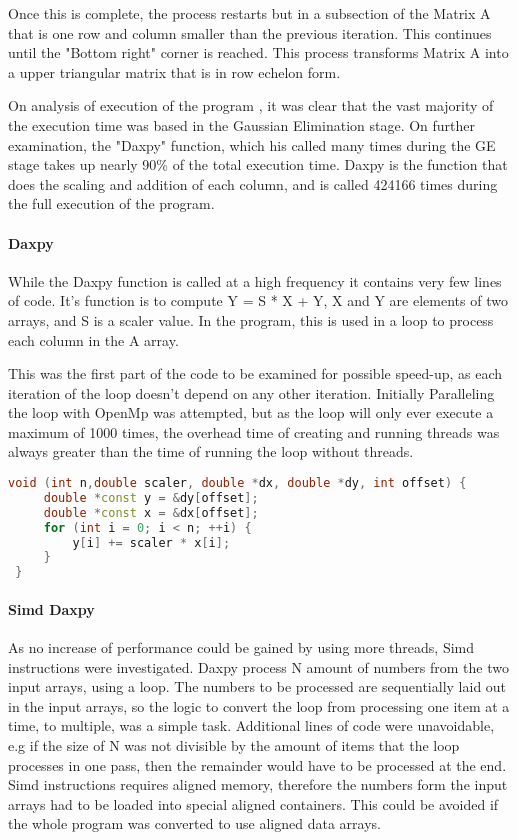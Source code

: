 \documentclass[conference]{acmsiggraph}
\begin{document}
Once this is complete, the process restarts but in a subsection of the Matrix A that is one row and column smaller than the previous iteration.
This continues until the "Bottom right" corner is reached. This process transforms Matrix A into a upper triangular matrix that is in row echelon form.

On analysis of execution of the program , it was clear that the vast majority of the execution time was based in the Gaussian Elimination stage.
On further examination, the "Daxpy" function, which his called many times during the GE stage takes up nearly 90\% of the total execution time.
Daxpy is the function that does the scaling and addition of each column, and is called 424166 times during the full execution of the program.

\paragraph{Daxpy}
While the Daxpy function is called at a high frequency it contains very few lines of code.
It's function is to compute Y = S * X + Y, X and Y are elements of two arrays, and S is a scaler value.
In the program, this is used in a loop to process each column in the A array.

This was the first part of the code to be examined for possible speed-up, as each iteration of the loop doesn't depend on any other iteration.
Initially Paralleling the loop with OpenMp was attempted, but as the loop will only ever execute a maximum of 1000 times,
 the overhead time of creating and running threads was always greater than the time of running the loop without threads.
 
 \begin{lstlisting}[language=C++,caption={daxpy Code},label=daxpyCode]
 void (int n,double scaler, double *dx, double *dy, int offset) {
	 double *const y = &dy[offset];
	 double *const x = &dx[offset];
	 for (int i = 0; i < n; ++i) {
		 y[i] += scaler * x[i];
	 }
 }
 \end{lstlisting}
 
\paragraph{Simd Daxpy}
As no increase of performance could be gained by using more threads, Simd instructions were investigated.
Daxpy process N amount of numbers from the two input arrays, using a loop. 
The numbers to be processed are sequentially laid out in the input arrays, so the logic to convert the loop from processing one item at a time, to multiple, was a simple task.
Additional lines of code were unavoidable, e.g if the size of N was not divisible by the amount of items that the loop processes in one pass, then the remainder would have to be processed at the end.
\\
Simd instructions requires aligned memory, therefore the numbers form the input arrays had to be loaded into special aligned containers. 
This could be avoided if the whole program was converted to use aligned data arrays.
\end{document}
